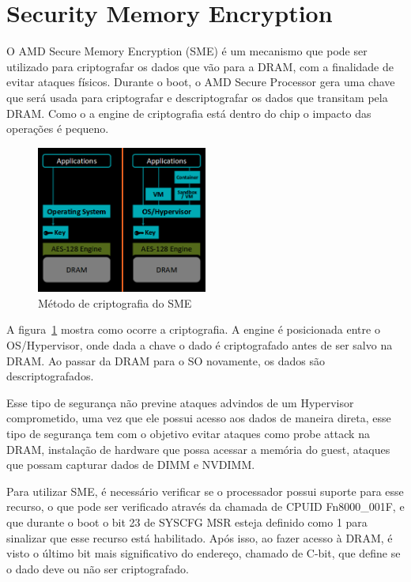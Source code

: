 \documentclass{report}
\newcommand{\todo}[1]{{\color{red} #1}}
\begin{document}
\section{Security Memory Encryption}
O AMD Secure Memory Encryption (SME) é um mecanismo que pode ser utilizado para
criptografar os dados que vão para a DRAM, com a finalidade de evitar ataques
físicos. Durante o boot, o AMD Secure Processor gera uma chave que será usada
para criptografar e descriptografar os dados que transitam pela DRAM\@. Como o
a engine de criptografia está dentro do chip o impacto das operações é pequeno.

\begin{figure}[h]
    \centering
    \includegraphics[width=0.5\textwidth]{img/sme}
    \caption{Método de criptografia do SME}\label{sme-1}
\end{figure}

A figura~\ref{sme-1} mostra como ocorre a criptografia. A engine é posicionada
entre o OS/Hypervisor, onde dada a chave o dado é criptografado antes de ser
salvo na DRAM\@. Ao passar da DRAM para o SO novamente, os dados são
descriptografados.

Esse tipo de segurança não previne ataques advindos de um Hypervisor
comprometido, uma vez que ele possui acesso aos dados de maneira direta, esse
tipo de segurança tem com o objetivo evitar ataques como \todo{probe attack na
DRAM}, instalação de hardware que possa acessar a memória do guest, ataques que
possam capturar dados de DIMM e NVDIMM\@.

Para utilizar SME, é necessário verificar se o processador possui suporte para
esse recurso, o que pode ser verificado através da chamada de CPUID
Fn8000\_001F, e que durante o boot o bit 23 de SYSCFG MSR esteja definido como
1 para sinalizar que esse recurso está habilitado. Após isso, ao fazer acesso à
DRAM, é visto o último bit mais significativo do endereço, chamado de C-bit,
que define se o dado deve ou não ser criptografado.
\end{document}
